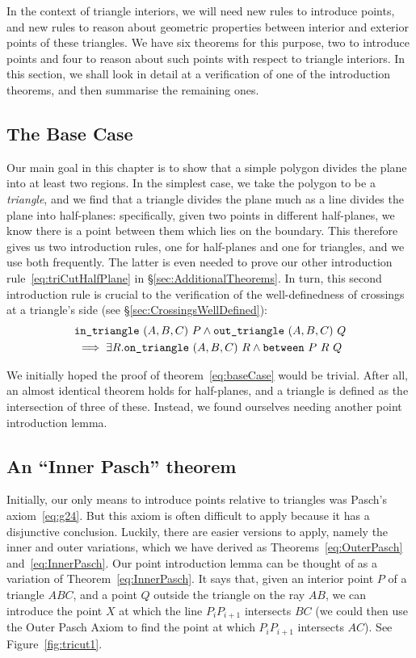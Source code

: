 In the context of triangle interiors, we will need new rules to introduce points, and new rules to reason about geometric properties between interior and exterior points of these triangles. We have six theorems for this purpose, two to introduce points and four to reason about such points with respect to triangle interiors. In this section, we shall look in detail at a verification of one of the introduction theorems, and then summarise the remaining ones.

\subsection{The Base Case}
Our main goal in this chapter is to show that a simple polygon divides the plane into at least two regions. In the simplest case, we take the polygon to be a \emph{triangle}, and we find that a triangle divides the plane much as a line divides the plane into half-planes: specifically, given two points in different half-planes, we know there is a point between them which lies on the boundary. This therefore gives us two introduction rules, one for half-planes and one for triangles, and we use both frequently. The latter is even needed to prove our other introduction rule~\eqref{eq:triCutHalfPlane} in \S\ref{sec:AdditionalTheorems}. In turn, this second introduction rule is crucial to the verification of the well-definedness of crossings at a triangle's side (see \S\ref{sec:CrossingsWellDefined}):
\begin{multline}\label{eq:baseCase}
\texttt{in\_triangle}\ (A,B,C)\ P \wedge \texttt{out\_triangle}\ (A,B,C)\ Q \\\implies \exists R. \texttt{on\_triangle}\ (A,B,C)\ R \wedge \texttt{between}\ P\ R\ Q
\end{multline}

We initially hoped the proof of theorem~\ref{eq:baseCase} would be trivial. After all, an almost identical theorem holds for half-planes, and a triangle is defined as the intersection of three of these. Instead, we found ourselves needing another point introduction lemma.

\subsection{An ``Inner Pasch'' theorem}
Initially, our only means to introduce points relative to triangles was Pasch's axiom~\eqref{eq:g24}. But this axiom is often difficult to apply because it has a disjunctive conclusion. Luckily, there are easier versions to apply, namely the inner and outer variations, which we have derived as Theorems~\ref{eq:OuterPasch} and~\ref{eq:InnerPasch}. Our point introduction lemma can be thought of as a variation of Theorem~\ref{eq:InnerPasch}. It says that, given an interior point $P$ of a triangle $ABC$, and a point $Q$ outside the triangle on the ray $AB$, we can introduce the point $X$ at which the line $P_iP_{i+1}$ intersects $BC$ (we could then use the Outer Pasch Axiom to find the point at which $P_iP_{i+1}$ intersects $AC$). See Figure~\ref{fig:tricut1}.

